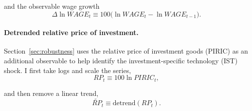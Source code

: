 and the observable wage growth
\begin{equation}
	\Delta \ln WAGE_t \equiv 100\big(\ln WAGE_t - \ln WAGE_{t-1}\big).
\end{equation}

\paragraph{Detrended relative price of investment.}
Section~\ref{sec:robustness} uses the relative price of investment goods (PIRIC) as an additional observable to help identify the investment-specific technology (IST) shock. I first take logs and scale the series,
\begin{equation}
	RP_t \equiv 100\ln PIRIC_t,
\end{equation}

and then remove a linear trend,
\begin{equation}
	\widetilde{RP}_t \equiv \text{detrend}(RP_t).
\end{equation}

